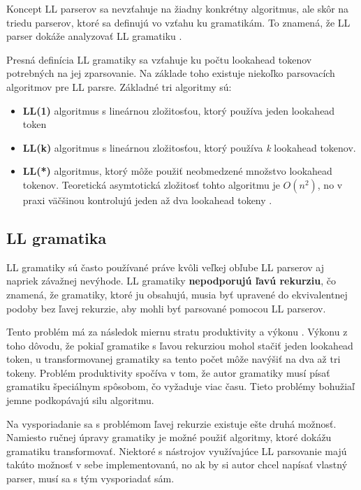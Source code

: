 Koncept LL parserov sa nevzťahuje na žiadny konkrétny algoritmus, ale skôr na triedu parserov, ktoré sa definujú vo vzťahu ku gramatikám. To znamená, že LL parser dokáže analyzovať LL gramatiku \cite{haberman:hard_parsing}.

Presná definícia LL gramatiky sa vzťahuje ku počtu lookahead tokenov potrebných na jej zparsovanie. Na základe toho existuje niekoľko parsovacích algoritmov pre LL parsre. Základné tri algoritmy sú:
\begin{itemize}
\item \textbf{LL(1)} algoritmus s lineárnou zložitosťou, ktorý používa jeden lookahead token 
\item \textbf{LL(k)} algoritmus s lineárnou zložitosťou, ktorý používa \textit{k} lookahead tokenov.
\item \textbf{LL(*)} algoritmus, ktorý môže použiť neobmedzené množstvo lookahead tokenov. Teoretická asymtotická zložitosť tohto algoritmu je $O(n^2)$, no v praxi väčšinou kontrolujú jeden až dva lookahead tokeny \cite{LL}.
\end{itemize}

\subsection{LL gramatika}\label{ll_grammar}
LL gramatiky sú často používané práve kvôli veľkej obľube LL parserov aj napriek závažnej nevýhode. LL gramatiky \textbf{nepodporujú ľavú rekurziu}, čo znamená, že gramatiky, ktoré ju obsahujú, musia byť upravené do ekvivalentnej podoby bez ľavej rekurzie, aby mohli byť parsované pomocou LL parserov.

Tento problém má za následok miernu stratu produktivity a výkonu \cite{tomassetti:parsing}. Výkonu z toho dôvodu, že pokiaľ gramatike s ľavou rekurziou mohol stačiť jeden lookahead token, u transformovanej gramatiky sa tento počet môže navýšiť na dva až tri tokeny. Problém produktivity spočíva v tom, že autor gramatiky musí písať gramatiku špeciálnym spôsobom, čo vyžaduje viac času. Tieto problémy bohužiaľ jemne podkopávajú silu algoritmu.

Na vysporiadanie sa s problémom ľavej rekurzie existuje ešte druhá možnosť. Namiesto ručnej úpravy gramatiky je možné použiť algoritmy, ktoré dokážu gramatiku transformovať. Niektoré s nástrojov využívajúce LL parsovanie majú takúto možnosť v sebe implementovanú, no ak by si autor chcel napísať vlastný parser, musí sa s tým vysporiadať sám.


